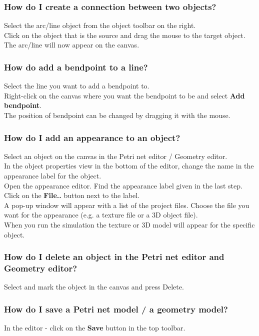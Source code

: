 \subsubsection{How do I create a connection between two objects?}
Select the arc/line object from the object toolbar on the right.  \\
Click on the object that is the source and drag the mouse to the target object. \\
The arc/line will now appear on the canvas. 

\subsubsection{How do add a bendpoint to a line?}
Select the line you want to add a bendpoint to. \\
Right-click on the canvas where you want the bendpoint to be and select \textbf{Add bendpoint}. \\
The position of bendpoint can be changed by dragging it with the mouse.

\subsubsection{How do I add an appearance to an object?}
Select an object on the canvas in the Petri net editor / Geometry editor. \\
In the object properties view in the bottom of the editor, change the name in the appearance label for the object. \\
Open the appearance editor. Find the appearance label given in the last step. \\
Click on the \textbf{File..} button next to the label. \\
A pop-up window will appear with a list of the project files. Choose the file you want for the appearance (e.g. a texture file or a 3D object file).\\
When you run the simulation the texture or 3D model will appear for the specific object. 

\subsubsection{How do I delete an object in the Petri net editor and Geometry editor?}
Select and mark the object in the canvas and press Delete.

\subsubsection{How do I save a Petri net model / a geometry model?}
In the editor - click on the \textbf{Save} button in the top toolbar.


